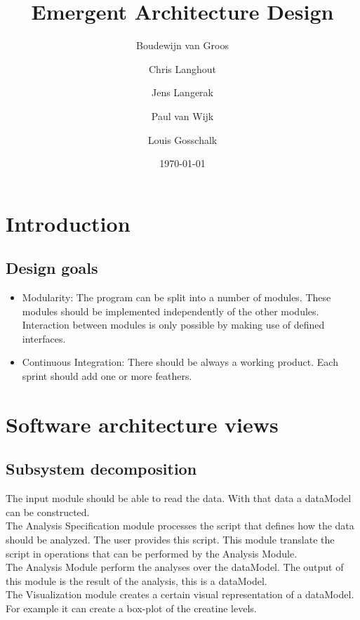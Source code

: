 \documentclass[a4paper]{article}
\title{Emergent Architecture Design}
\author[1]{Boudewijn van Groos}
\author[2]{Chris Langhout}
\author[3]{Jens Langerak}
\author[4]{Paul van Wijk}
\author[5]{Louis Gosschalk}
\affil[1]{bvangroos \\
4229843}
\affil[2]{clanghout \\
4281705}
\affil[3]{jlangerak \\
4317327}
\affil[4]{pjvanwijk \\
4285034}
\affil[5]{lgosschalk \\
4214528}
\date{\today}
\begin{document}
\maketitle
\tableofcontents
\newpage

\section{Introduction}
\subsection{Design goals}
\begin{itemize}
    \item Modularity:
    The program can be split into a number of modules. These modules should be
    implemented independently of the other modules. Interaction between modules
    is only possible by making use of defined interfaces.
    \item Continuous Integration: There should be always a working product. Each
    sprint should add one or more feathers.
\end{itemize}

\section{Software architecture views}
\subsection{Subsystem decomposition}

The input module should be able to read the data. With that data a dataModel
can be constructed. \\
The Analysis Specification module processes the script that defines how the
data should be analyzed. The user provides this script. This module translate
the script in operations that can be performed by the Analysis Module.\\
The Analysis Module perform the analyses over the dataModel. The output of this
module is the result of the analysis, this is a dataModel.\\
The Visualization module creates a certain visual representation of a
dataModel. For example it can create a box-plot of the creatine levels.
\end{document}
